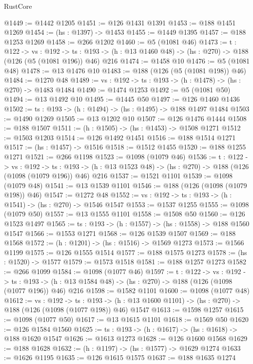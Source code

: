 \begin{lexlean}{RustCore}
\begin{coremodule}
@1449 := @1442 @1205
@1451 := @126 @1431 @1391
@1453 := @188 @1451 @1269
@1454 := (hs : @1397) -> @1453
@1455 := @1449 @1395
@1457 := @188 @1253 @1269
@1458 := @266 @1202
@1460 := @5 (@1081 @46)
@1473 := {t : @122} ->
  {vs : @192} ->
  {ts : @193} -> (h : @13 @1460 @48) -> (hs : @270) -> @188 (@126 (@5 (@1081 @196)) @46) @216
@1474 := @1458 @10
@1476 := @5 (@1081 @48)
@1478 := @13 @1476 @10
@1483 := @188 (@126 (@5 (@1081 @198)) @46)
@1484 := @1270 @48
@1489 := {vs : @192} -> {ts : @193} -> (h : @1478) -> (hs : @270) -> @1483 @1484
@1490 := @1474 @1253
@1492 := @5 (@1081 @50)
@1494 := @13 @1492 @10
@1495 := @1445 @50
@1497 := @126 @1460 @1436
@1502 := {ts : @193} -> (h : @1494) -> (hs : @1495) -> @188 @1497 @1484
@1503 := @1490 @1269
@1505 := @13 @1202 @10
@1507 := @126 @1476 @1444
@1508 := @188 @1507
@1511 := (h : @1505) -> (hs : @1453) -> @1508 @1271
@1512 := @1503 @1203
@1514 := @126 @1492 @1451
@1516 := @188 @1514 @1271
@1517 := (hs : @1457) -> @1516
@1518 := @1512 @1455
@1520 := @188 @1255 @1271
@1521 := @266 @1198
@1523 := @1098 (@1079 @46)
@1536 := {t : @122} ->
  {vs : @192} ->
  {ts : @193} -> (h : @13 @1523 @48) -> (hs : @270) -> @188 (@126 (@1098 (@1079 @196)) @46) @216
@1537 := @1521 @1101
@1539 := @1098 (@1079 @48)
@1541 := @13 @1539 @1101
@1546 := @188 (@126 (@1098 (@1079 @198)) @46)
@1547 := @1272 @48
@1552 := {vs : @192} -> {ts : @193} -> (h : @1541) -> (hs : @270) -> @1546 @1547
@1553 := @1537 @1255
@1555 := @1098 (@1079 @50)
@1557 := @13 @1555 @1101
@1558 := @1508 @50
@1560 := @126 @1523 @1497
@1565 := {ts : @193} -> (h : @1557) -> (hs : @1558) -> @188 @1560 @1547
@1566 := @1553 @1271
@1568 := @126 @1539 @1507
@1569 := @188 @1568
@1572 := (h : @1201) -> (hs : @1516) -> @1569 @1273
@1573 := @1566 @1199
@1575 := @126 @1555 @1514
@1577 := @188 @1575 @1273
@1578 := (hs : @1520) -> @1577
@1579 := @1573 @1518
@1581 := @188 @1257 @1273
@1582 := @266 @1099
@1584 := @1098 (@1077 @46)
@1597 := {t : @122} ->
  {vs : @192} ->
  {ts : @193} -> (h : @13 @1584 @48) -> (hs : @270) -> @188 (@126 (@1098 (@1077 @196)) @46) @216
@1598 := @1582 @1101
@1600 := @1098 (@1077 @48)
@1612 := {vs : @192} ->
  {ts : @193} -> (h : @13 @1600 @1101) -> (hs : @270) -> @188 (@126 (@1098 (@1077 @198)) @46) @1547
@1613 := @1598 @1257
@1615 := @1098 (@1077 @50)
@1617 := @13 @1615 @1101
@1618 := @1569 @50
@1620 := @126 @1584 @1560
@1625 := {ts : @193} -> (h : @1617) -> (hs : @1618) -> @188 @1620 @1547
@1626 := @1613 @1273
@1628 := @126 @1600 @1568
@1629 := @188 @1628
@1632 := (h : @1197) -> (hs : @1577) -> @1629 @1274
@1633 := @1626 @1195
@1635 := @126 @1615 @1575
@1637 := @188 @1635 @1274

\end{coremodule}
\end{lexlean}
